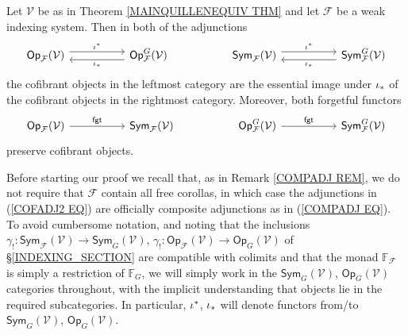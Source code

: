 \documentclass[a4paper,10pt]{article}%
\begin{document}
\begin{lemma}\label{MAINLEM LEM}
	Let $\mathcal{V}$ be as in 	
	Theorem \ref{MAINQUILLENEQUIV THM}
	and let $\mathcal{F}$ be a weak indexing system.
Then in both of the adjunctions
\begin{equation}\label{COFADJ2 EQ}
\begin{tikzcd}[column sep =5em]
	\mathsf{Op}_{\mathcal{F}}(\mathcal{V}) \ar[shift left=1.5]{r}{\iota^{\**}} 
&
	\mathsf{Op}^G_{\mathcal{F}}(\mathcal{V})
	\ar[shift left=1.5]{l}{\iota_{\**}}
&
	\mathsf{Sym}_{\mathcal{F}}(\mathcal{V}) \ar[shift left=1.5]{r}{\iota^{\**}} 
&
	\mathsf{Sym}^G_{\mathcal{F}}(\mathcal{V})
	\ar[shift left=1.5]{l}{\iota_{\**}}	
\end{tikzcd}
\end{equation}	
the cofibrant objects in the leftmost category are the essential image under $\iota_{\**}$ of the 
cofibrant objects in the rightmost category.
Moreover, both forgetful functors 
\begin{equation}\label{FGTFUNC EQ}
\begin{tikzcd}[column sep =5em]
	\mathsf{Op}_{\mathcal{F}}(\mathcal{V}) \ar{r}{\mathsf{fgt}} 
&
	\mathsf{Sym}_{\mathcal{F}}(\mathcal{V})
&
	\mathsf{Op}^G_{\mathcal{F}}(\mathcal{V})
	 \ar{r}{\mathsf{fgt}}
&
	\mathsf{Sym}^G_{\mathcal{F}}(\mathcal{V})
\end{tikzcd}
\end{equation}
preserve cofibrant objects.
\end{lemma}


Before starting our proof we recall that, as in
Remark \ref{COMPADJ REM},
we do not require that $\mathcal{F}$ contain all free corollas, in which case the adjunctions in 
(\ref{COFADJ2 EQ}) are officially composite adjunctions as in 
(\ref{COMPADJ EQ}).
To avoid cumbersome notation, and noting that the inclusions 
$\gamma_! \colon 
\mathsf{Sym}_{\mathcal{F}}(\mathcal{V}) \to 
\mathsf{Sym}_G(\mathcal{V})$,
$\gamma_! \colon 
\mathsf{Op}_{\mathcal{F}}(\mathcal{V}) \to 
\mathsf{Op}_G(\mathcal{V})$
of \S \ref{INDEXING_SECTION}
are compatible with colimits and that 
the monad $\mathbb{F}_{\mathcal{F}}$
is simply a restriction of $\mathbb{F}_G$,
we will simply work in the 
$\mathsf{Sym}_G(\mathcal{V})$,
$\mathsf{Op}_G(\mathcal{V})$ categories throughout,
with the implicit understanding 
that objects lie in the required subcategories.
In particular, $\iota^{\**}$, $\iota_{\**}$
will denote functors from/to 
$\mathsf{Sym}_G(\mathcal{V})$,
$\mathsf{Op}_G(\mathcal{V})$.
\end{document}
